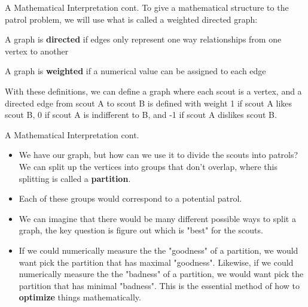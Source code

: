 \documentclass{beamer}
\begin{document}
\begin{frame}{A Mathematical Interpretation cont.}
To give a mathematical structure to the patrol problem, we will use what is called a weighted directed graph:
\begin{definition}
A graph is \textbf{directed} if edges only represent one way relationships from one vertex to another
\end{definition}
\begin{definition}
A graph is \textbf{weighted} if a numerical value can be assigned to each edge
\end{definition}
With these definitions, we can define a graph where each scout is a vertex, and a directed edge from scout A to scout B is defined with weight 1 if scout A likes scout B, 0 if scout A is indifferent to B, and -1 if scout A dislikes scout B.
\end{frame}

\begin{frame}{A Mathematical Interpretation cont.}
\begin{itemize}
\item[]We have our graph, but how can we use it to divide the scouts into patrols? We can split up the vertices into groups that don't overlap, where this splitting is called a \textbf{partition}.
\item[]Each of these groups would correspond to a potential patrol.
\item[]We can imagine that there would be many different possible ways to split a graph, the key question is figure out which is "best" for the scouts.
\item[]If we could numerically measure the the "goodness" of a partition, we would want pick the partition that has maximal "goodness". Likewise, if we could numerically measure the the "badness" of a partition, we would want pick the partition that has minimal "badness". This is the essential method of how to \textbf{optimize} things mathematically.
\end{itemize}
\end{frame}
\end{document}
